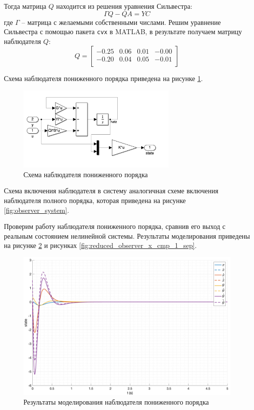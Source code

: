 Тогда матрица $Q$ находится из решения уравнения Сильвестра: 
\begin{equation}
   \Gamma Q - QA = YC 
\end{equation}
где $\Gamma$ -- матрица с желаемыми собственными числами. 
Решим уравнение Сильвестра с помощью пакета \texttt{cvx} в MATLAB, в результате получаем матрицу наблюдателя $Q$:
\begin{equation}
    Q = \begin{bmatrix}
    -0.25  & 0.06  & 0.01  & -0.00 \\ 
    -0.20  & 0.04  & 0.05  & -0.01 \\ 
    \end{bmatrix}
\end{equation}

Схема наблюдателя пониженного порядка приведена на рисунке \ref{fig:reduced_observer_scheme}.
\begin{figure}[ht!]
    \centering
    \includegraphics[width=0.7\textwidth]{media/reduced_observer_scheme.png}
    \caption{Схема наблюдателя пониженного порядка}
    \label{fig:reduced_observer_scheme}
\end{figure}

Схема включения наблюдателя в систему аналогичная схеме включения наблюдателя полного порядка, 
которая приведена на рисунке \ref{fig:observer_system}. 

Проверим работу наблюдателя пониженного порядка, сравнив его выход с реальным состоянием нелинейной системы.
Результаты моделирования приведены на рисунке \ref{fig:reduced_observer_x_1} и рисунках \ref{fig:reduced_observer_x_cmp_1_sep}.
\begin{figure}[ht!]
    \centering
    \includegraphics[width=\textwidth]{media/plots/reduced_observer/reduced_observer_cmp_1.png}
    \caption{Результаты моделирования наблюдателя пониженного порядка}
    \label{fig:reduced_observer_x_1}
\end{figure}

